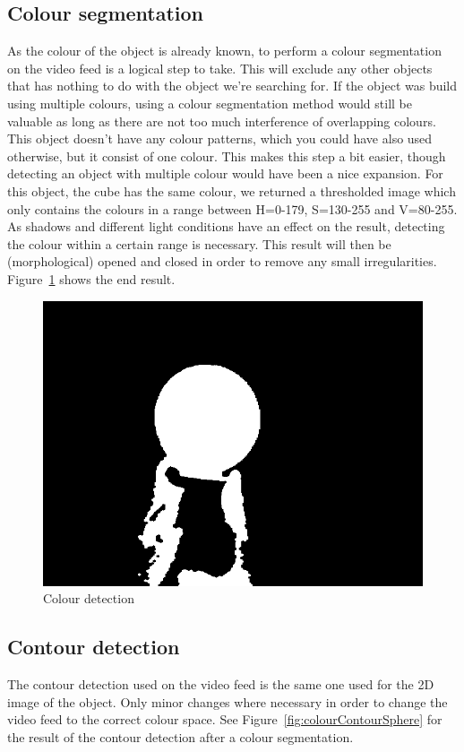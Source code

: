 \documentclass{report}
\begin{document}
\subsection{Colour segmentation}
As the colour of the object is already known, to perform a colour segmentation on the video feed is a logical step to take. This will exclude any other objects that has nothing to do with the object we're searching for. If the object was build using multiple colours, using a colour segmentation method would still be valuable as long as there are not too much interference of overlapping colours. This object doesn't have any colour patterns, which you could have also used otherwise, but it consist of one colour. This makes this step a bit easier, though detecting an object with multiple colour would have been a nice expansion.
For this object, the cube has the same colour, we returned a thresholded image which only contains the colours in a range between H=0-179, S=130-255 and V=80-255. As shadows and different light conditions have an effect on the result, detecting the colour within a certain range is necessary. This result will then be (morphological) opened and closed in order to remove any small irregularities.
Figure~\ref{fig:colourSphere} shows the end result.

\begin{figure}[h!]
\center
\includegraphics[width=.5\textwidth]{../images/colour_sphere.png}
\caption[]{Colour detection}
\label{fig:colourSphere}
\end{figure}

\subsection{Contour detection}
The contour detection used on the video feed is the same one used for the 2D image of the object. Only minor changes where necessary in order to change the video feed to the correct colour space. See Figure~\ref{fig:colourContourSphere} for the result of the contour detection after a colour segmentation.
\end{document}
